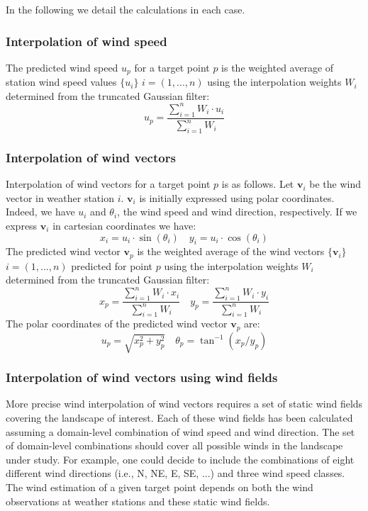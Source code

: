\documentclass[11pt,a4paper]{article}
\begin{document}
In the following we detail the calculations in each case.
\subsubsection{Interpolation of wind speed}
The predicted wind speed $u_{p}$ for a target point $p$ is the weighted average of station wind speed values $\{u_{i}\}$  $i=(1,... , n)$ using the interpolation weights $W_i$ determined from the truncated Gaussian filter:
\begin{equation}
u_{p} = \frac{\sum_{i=1}^{n}{W_i \cdot u_{i}}}{\sum_{i=1}^{n}{W_i}}
\end{equation}
\subsubsection{Interpolation of wind vectors}
Interpolation of wind vectors for a target point $p$ is as follows. Let $\mathbf{v}_{i}$ be the wind vector in weather station $i$. $\mathbf{v}_{i}$ is initially expressed using polar coordinates. Indeed, we have $u_{i}$ and $\theta_{i}$, the wind speed and wind direction, respectively. If we express $\mathbf{v}_{i}$ in cartesian coordinates we have:
\begin{equation}
x_{i} = u_{i}\cdot \sin(\theta_{i}) \quad y_{i} = u_{i}\cdot \cos(\theta_{i})
\end{equation}
The predicted wind vector $\mathbf{v}_{p}$ is the weighted average of the wind vectors $\{\mathbf{v}_{i}\}$  $i=(1,... , n)$ predicted for point $p$ using the interpolation weights $W_i$ determined from the truncated Gaussian filter:
\begin{equation}
x_{p} = \frac{\sum_{i=1}^{n}{W_i \cdot x_{i}}}{\sum_{i=1}^{n}{W_i}}  \quad y_{p} = \frac{\sum_{i=1}^{n}{W_i \cdot y_{i}}}{\sum_{i=1}^{n}{W_i}}
\end{equation}
The polar coordinates of the predicted wind vector $\mathbf{v}_{p}$  are:
\begin{equation}
u_{p} = \sqrt{x^{2}_{p} + y^{2}_{p}} \quad \theta_{p} = \tan^{-1}(x_{p}/y_{p})
\end{equation}

\subsubsection{Interpolation of wind vectors using wind fields}
More precise wind interpolation of wind vectors requires a set of static wind fields covering the landscape of interest. Each of these wind fields has been calculated assuming a domain-level combination of wind speed and wind direction. The set of domain-level combinations should cover all possible winds in the landscape under study. For example, one could decide to include the combinations of eight different wind directions (i.e., N, NE, E, SE, ...) and three wind speed classes. The wind estimation of a given target point depends on both the wind observations at weather stations and these static wind fields.
\end{document}

